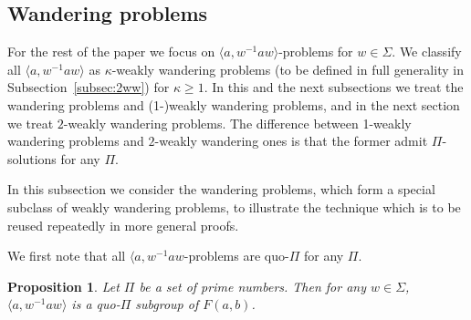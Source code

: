 \documentclass[10pt,a4paper]{amsart}
\newtheorem{proposition}[theorem]{Proposition}
\theoremstyle{definition}
\theoremstyle{definition}
\numberwithin{equation}{section}
\begin{document}
\subsection{Wandering problems}

For the rest of the paper we focus on $\langle a, w^{-1}aw\rangle$-problems for $w\in \Sigma$. We classify all $\langle a, w^{-1}aw\rangle$ as $\kappa$-weakly wandering problems (to be defined in full generality in Subsection~\ref{subsec:2ww}) for $\kappa\geq 1$. In this and the next subsections we treat the wandering problems and (1-)weakly wandering problems, and in the next section we treat $2$-weakly wandering problems. The difference between 1-weakly wandering problems and $2$-weakly wandering ones is that the former admit $\Pi$-solutions for any $\Pi$.

In this subsection we consider the wandering problems, which form a special subclass of weakly wandering problems, to illustrate the technique which is to be reused repeatedly in more general proofs.



We first note that all $\langle a, w^{-1}aw$-problems are quo-$\Pi$ for any $\Pi$.

\begin{proposition} Let $\Pi$ be a set of prime numbers. Then for any $w\in \Sigma$, $\langle a, w^{-1}aw\rangle$ is a quo-$\Pi$ subgroup of $F(a, b)$.
\end{proposition}
\end{document}

